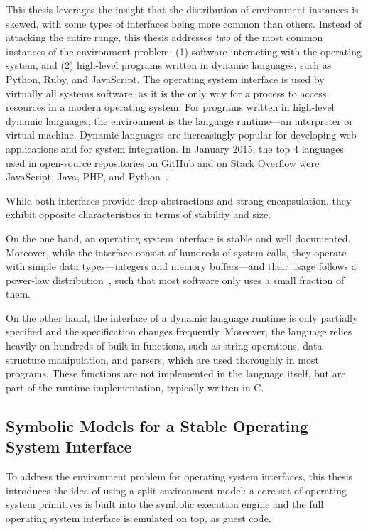 This thesis leverages the insight that the distribution of environment instances is skewed, with some types of interfaces being more common than others.
%
Instead of attacking the entire range, this thesis addresses \emph{two} of the most common instances of the environment problem:  (1) software interacting with the operating system, and (2) high-level programs written in dynamic languages, such as Python, Ruby, and JavaScript.
%
The operating system interface is used by virtually all systems software, as it is the only way for a process to access resources in a modern operating system.
%
For programs written in high-level dynamic languages, the environment is the language runtime---an interpreter or virtual machine.  Dynamic languages are increasingly popular for developing web applications and for system integration.  In January 2015, the top 4 languages used in open-source repositories on GitHub and on Stack Overflow were JavaScript, Java, PHP, and Python~\cite{lang-stats-2015}.

While both interfaces provide deep abstractions and strong encapsulation, they exhibit opposite characteristics in terms of stability and size.

On the one hand, an operating system interface is stable and well documented.
%
Moreover, while the interface consist of hundreds of system calls, they operate with simple data types---integers and memory buffers---and their usage follows a power-law distribution~\cite{banabic-elusive}, such that most software only uses a small fraction of them.

On the other hand, the interface of a dynamic language runtime is only partially specified and the specification changes frequently.
%
Moreover, the language relies heavily on hundreds of built-in functions, such as string operations, data structure manipulation, and parsers, which are used thoroughly in most programs.
%
These functions are not implemented in the language itself, but are part of the runtime implementation, typically written in C.


\subsection{Symbolic Models for a Stable Operating System Interface}

To address the environment problem for operating system interfaces, this thesis introduces the idea of using a split environment model:
%
a core set of operating system primitives is built into the symbolic execution engine and the full operating system interface is emulated on top, as guest code.


